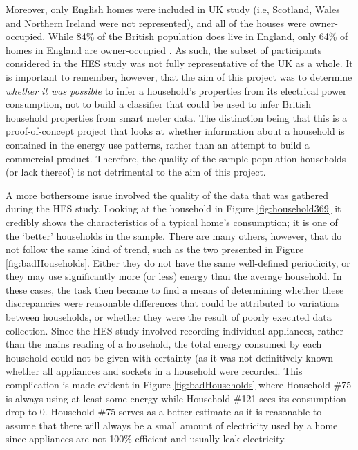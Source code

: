 Moreover, only English homes were included in UK study (i.e, Scotland, Wales and Northern Ireland were not represented), and all of the houses were owner-occupied.  While 84\% of the British population does live in England, only 64\% of homes in England are owner-occupied \cite{ONS}. As such, the subset of participants considered in the HES study was not fully representative of the UK as a whole. It is important to remember, however, that the aim of this project was to determine \textit{whether it was possible} to infer a household's properties from its electrical power consumption, not to build a classifier that could be used to infer British household properties from smart meter data. The distinction being that this is a proof-of-concept project that looks at whether information about a household is contained in the energy use patterns, rather than an attempt to build a commercial product. Therefore, the quality of the sample population households (or lack thereof) is not detrimental to the aim of this project.

A more bothersome issue involved the quality of the data that was gathered during the HES study. Looking at the household in Figure \ref{fig:household369} it credibly shows the characteristics of a typical home's consumption; it is one of the `better' households in the sample. There are many others, however, that do not follow the same kind of trend, such as the two presented in Figure \ref{fig:badHouseholds}. Either they do not have the same well-defined periodicity, or they may use significantly more (or less) energy than the average household. In these cases, the task then became to find a means of determining whether these discrepancies were reasonable differences that could be attributed to variations between households, or whether they were the result of poorly executed data collection. Since the HES study involved recording individual appliances, rather than the mains reading of a household, the total energy consumed by each household could not be given with certainty (as it was not definitively known whether all appliances and sockets in a household were recorded. This complication is made evident in Figure \ref{fig:badHouseholds} where Household \#75 is always using at least some energy while Household \#121 sees its consumption drop to 0. Household \#75 serves as a better estimate as it is reasonable to assume that there will always be a small amount of electricity used by a home since appliances are not 100\% efficient and usually leak electricity.

\badHouseholds

